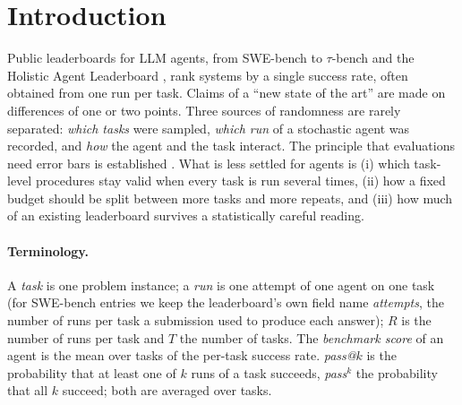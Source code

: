\section{Introduction}
Public leaderboards for LLM agents, from SWE-bench \citep{jimenez2024swebench} to $\tau$-bench \citep{yao2024taubench} and the Holistic Agent Leaderboard \citep{kapoor2026hal}, rank systems by a single success rate, often obtained from one run per task. Claims of a ``new state of the art'' are made on differences of one or two points. Three sources of randomness are rarely separated: \emph{which tasks} were sampled, \emph{which run} of a stochastic agent was recorded, and \emph{how} the agent and the task interact. The principle that evaluations need error bars is established \citep{miller2024error,bowyer2025clt,madaan2024variance,bouthillier2021variance}. What is less settled for agents is (i) which task-level procedures stay valid when every task is run several times, (ii) how a fixed budget should be split between more tasks and more repeats, and (iii) how much of an existing leaderboard survives a statistically careful reading.

\paragraph{Terminology.} A \emph{task} is one problem instance; a \emph{run} is one attempt of one agent on one task (for SWE-bench entries we keep the leaderboard's own field name \emph{attempts}, the number of runs per task a submission used to produce each answer); $R$ is the number of runs per task and $T$ the number of tasks. The \emph{benchmark score} of an agent is the mean over tasks of the per-task success rate. \emph{pass@$k$} is the probability that at least one of $k$ runs of a task succeeds, \emph{pass$^k$} the probability that all $k$ succeed; both are averaged over tasks.

